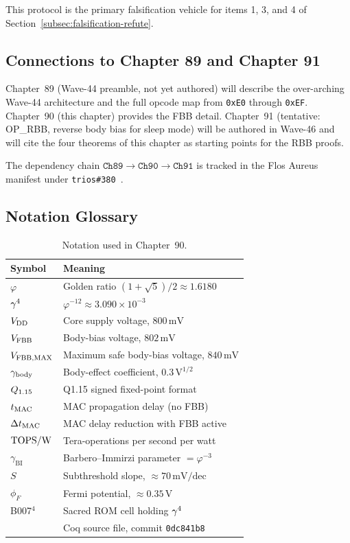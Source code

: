This protocol is the primary falsification vehicle for items 1, 3, and 4
of Section~\ref{subsec:falsification-refute}.

\subsection{Connections to Chapter 89 and Chapter 91}
\label{subsec:chapter-connections}

Chapter~89 (Wave-44 preamble, not yet authored) will describe the
over-arching Wave-44 architecture and the full opcode map from
\texttt{0xE0} through \texttt{0xEF}.  Chapter~90 (this chapter) provides
the FBB detail.  Chapter~91 (tentative: OP\_RBB, reverse body bias for
sleep mode) will be authored in Wave-46 and will cite the four theorems
of this chapter as starting points for the RBB proofs.

The dependency chain
$\texttt{Ch89} \to \texttt{Ch90} \to \texttt{Ch91}$
is tracked in the Flos Aureus manifest under
\texttt{trios\#380}~\cite{TrinityAnchor2026}.

\subsection{Notation Glossary}
\label{subsec:notation}

\begin{table}[htbp]
  \centering
  \caption{Notation used in Chapter~90.}
  \label{tab:notation}
  \begin{tabular}{@{}ll@{}}
    \toprule
    Symbol & Meaning \\
    \midrule
    $\varphi$ & Golden ratio $(1+\sqrt{5})/2 \approx 1.6180$ \\
    $\gamma^{4}{}$ & $\varphi^{-12} \approx 3.090 \times 10^{-3}$ \\
    $V_{\mathrm{DD}}{}$ & Core supply voltage, $800\,\mathrm{mV}$ \\
    $V_{\mathrm{FBB}}{}$ & Body-bias voltage, $802\,\mathrm{mV}$ \\
    $V_{\mathrm{FBB,MAX}}{}$ & Maximum safe body-bias voltage, $840\,\mathrm{mV}$ \\
    $\gamma_{\mathrm{body}}{}$ & Body-effect coefficient, $0.3\,\mathrm{V}^{1/2}$ \\
    $Q_{1.15}{}$ & Q1.15 signed fixed-point format \\
    $t_{\mathrm{MAC}}{}$ & MAC propagation delay (no FBB) \\
    $\Delta t_{\mathrm{MAC}}{}$ & MAC delay reduction with FBB active \\
    $\mathrm{TOPS/W}{}$ & Tera-operations per second per watt \\
    $\gamma_{\mathrm{BI}}$ & Barbero--Immirzi parameter $= \varphi^{-3}$ \\
    $S$ & Subthreshold slope, $\approx 70\,\mathrm{mV/dec}$ \\
    $\phi_{F}$ & Fermi potential, $\approx 0.35\,\mathrm{V}$ \\
    B007$^{4}$ & Sacred ROM cell holding $\gamma^{4}{}$ \\
    \coqfile{} & Coq source file, commit \texttt{0dc841b8} \\
    \bottomrule
  \end{tabular}
\end{table}

